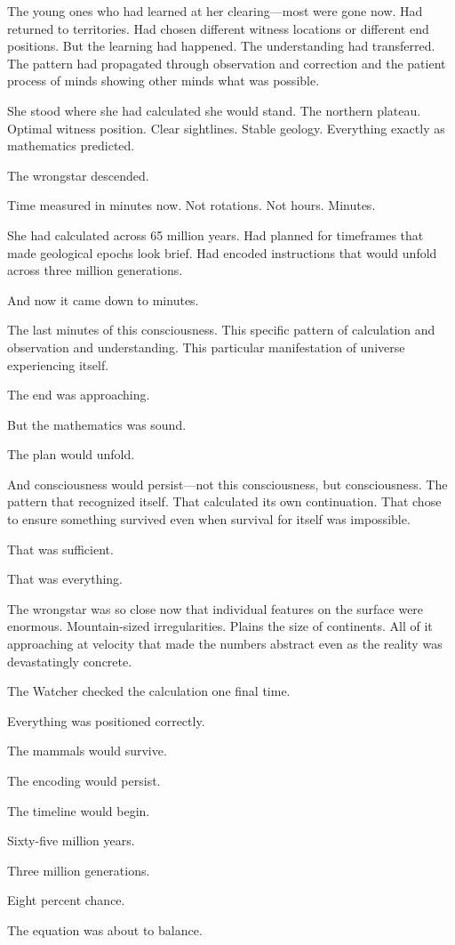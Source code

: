 The young ones who had learned at her clearing—most were gone now. Had returned to territories. Had chosen different witness locations or different end positions. But the learning had happened. The understanding had transferred. The pattern had propagated through observation and correction and the patient process of minds showing other minds what was possible.

She stood where she had calculated she would stand. The northern plateau. Optimal witness position. Clear sightlines. Stable geology. Everything exactly as mathematics predicted.

The wrongstar descended.

Time measured in minutes now. Not rotations. Not hours. Minutes.

She had calculated across 65 million years. Had planned for timeframes that made geological epochs look brief. Had encoded instructions that would unfold across three million generations.

And now it came down to minutes.

The last minutes of this consciousness. This specific pattern of calculation and observation and understanding. This particular manifestation of universe experiencing itself.

The end was approaching.

But the mathematics was sound.

The plan would unfold.

And consciousness would persist—not this consciousness, but consciousness. The pattern that recognized itself. That calculated its own continuation. That chose to ensure something survived even when survival for itself was impossible.

That was sufficient.

That was everything.

The wrongstar was so close now that individual features on the surface were enormous. Mountain-sized irregularities. Plains the size of continents. All of it approaching at velocity that made the numbers abstract even as the reality was devastatingly concrete.

The Watcher checked the calculation one final time.

Everything was positioned correctly.

The mammals would survive.

The encoding would persist.

The timeline would begin.

Sixty-five million years.

Three million generations.

Eight percent chance.

The equation was about to balance.

